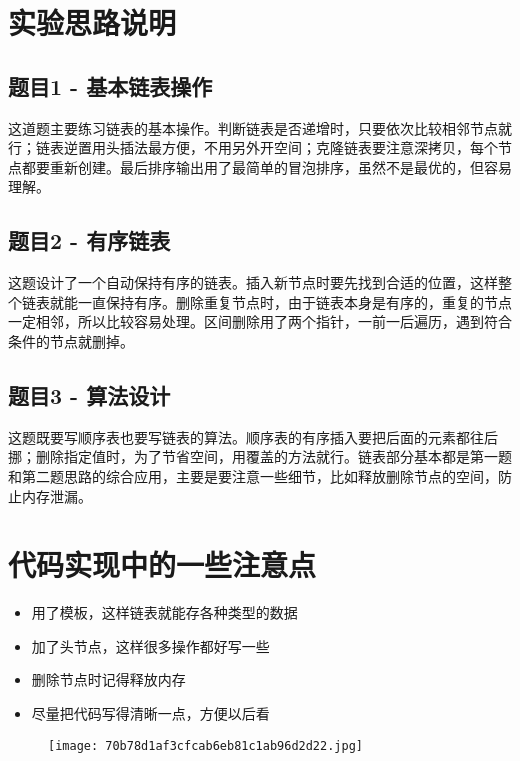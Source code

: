 \section{实验思路说明}

\subsection{题目1 - 基本链表操作}

这道题主要练习链表的基本操作。判断链表是否递增时，只要依次比较相邻节点就行；链表逆置用头插法最方便，不用另外开空间；克隆链表要注意深拷贝，每个节点都要重新创建。最后排序输出用了最简单的冒泡排序，虽然不是最优的，但容易理解。

\subsection{题目2 - 有序链表}

这题设计了一个自动保持有序的链表。插入新节点时要先找到合适的位置，这样整个链表就能一直保持有序。删除重复节点时，由于链表本身是有序的，重复的节点一定相邻，所以比较容易处理。区间删除用了两个指针，一前一后遍历，遇到符合条件的节点就删掉。

\subsection{题目3 - 算法设计}

这题既要写顺序表也要写链表的算法。顺序表的有序插入要把后面的元素都往后挪；删除指定值时，为了节省空间，用覆盖的方法就行。链表部分基本都是第一题和第二题思路的综合应用，主要是要注意一些细节，比如释放删除节点的空间，防止内存泄漏。

\section{代码实现中的一些注意点}

\begin{itemize}
	\item 用了模板，这样链表就能存各种类型的数据
	\item 加了头节点，这样很多操作都好写一些
	\item 删除节点时记得释放内存
	\item 尽量把代码写得清晰一点，方便以后看
\end{itemize}

\begin{figure}[H]
\centering
\texttt{[image: 70b78d1af3cfcab6eb81c1ab96d2d22.jpg]}
\label{}
\end{figure}

